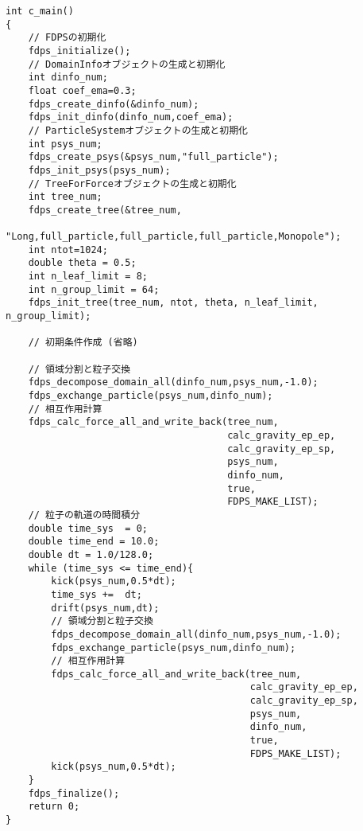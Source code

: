 \documentclass[10pt,a4paper,fleqn]{article}
\begin{document}

\begin{mdframed}[
    backgroundcolor=bg,
    topline=false,
    bottomline=false,
    leftline=false,
    rightline=false]
\begin{verbatim}
int c_main()
{
    // FDPSの初期化
    fdps_initialize();
    // DomainInfoオブジェクトの生成と初期化
    int dinfo_num;
    float coef_ema=0.3;
    fdps_create_dinfo(&dinfo_num);
    fdps_init_dinfo(dinfo_num,coef_ema);
    // ParticleSystemオブジェクトの生成と初期化
    int psys_num;
    fdps_create_psys(&psys_num,"full_particle");
    fdps_init_psys(psys_num);
    // TreeForForceオブジェクトの生成と初期化
    int tree_num;
    fdps_create_tree(&tree_num, 
                     "Long,full_particle,full_particle,full_particle,Monopole");
    int ntot=1024;
    double theta = 0.5;
    int n_leaf_limit = 8;
    int n_group_limit = 64;
    fdps_init_tree(tree_num, ntot, theta, n_leaf_limit, n_group_limit);
    
    // 初期条件作成 (省略)

    // 領域分割と粒子交換
    fdps_decompose_domain_all(dinfo_num,psys_num,-1.0);
    fdps_exchange_particle(psys_num,dinfo_num);
    // 相互作用計算
    fdps_calc_force_all_and_write_back(tree_num, 
                                       calc_gravity_ep_ep,
                                       calc_gravity_ep_sp,
                                       psys_num,
                                       dinfo_num,
                                       true,
                                       FDPS_MAKE_LIST);
    // 粒子の軌道の時間積分
    double time_sys  = 0;
    double time_end = 10.0;
    double dt = 1.0/128.0;
    while (time_sys <= time_end){
        kick(psys_num,0.5*dt);
        time_sys +=  dt;
        drift(psys_num,dt);
        // 領域分割と粒子交換
        fdps_decompose_domain_all(dinfo_num,psys_num,-1.0);
        fdps_exchange_particle(psys_num,dinfo_num);
        // 相互作用計算
        fdps_calc_force_all_and_write_back(tree_num,
                                           calc_gravity_ep_ep,
                                           calc_gravity_ep_sp,
                                           psys_num,
                                           dinfo_num,
                                           true,
                                           FDPS_MAKE_LIST);
        kick(psys_num,0.5*dt);
    }
    fdps_finalize();
    return 0;
}
\end{verbatim}
\end{mdframed}



\end{document}
